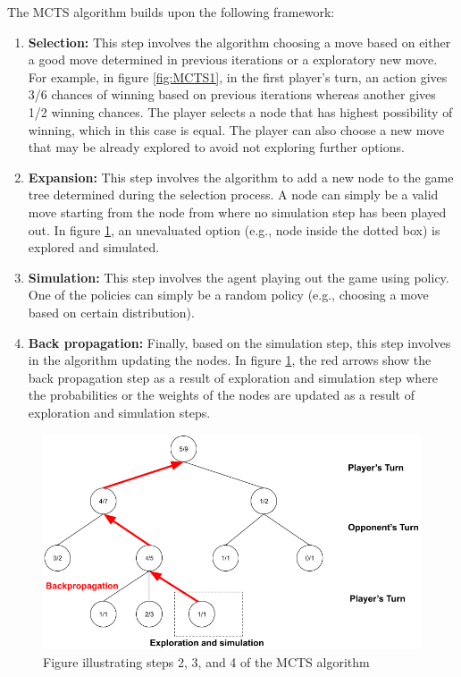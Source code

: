The \gls{MCTS} algorithm builds upon the following framework:
\begin{enumerate}
    \item \textbf{Selection:} This step involves the algorithm choosing a move based on either a good move determined in previous iterations or a exploratory new move. For example, in figure \ref{fig:MCTS1}, in the first player's turn, an action gives 3/6 chances of winning based on previous iterations whereas another gives 1/2 winning chances. The player selects a node that has highest possibility of winning, which in this case is equal. The player can also choose a new move that may be already explored to avoid not exploring further options.
    \item \textbf{Expansion:} This step involves the algorithm to add a new node to the game tree determined during the selection process. A node can simply be a valid move starting from the node from where no simulation step has been played out. In figure \ref{fig:MCTS2}, an unevaluated option (e.g., node inside the dotted box) is explored and simulated.
    \item \textbf{Simulation:} This step involves the agent playing out the game using policy. One of the policies can simply be a random policy (e.g., choosing a move based on certain distribution).
    \item \textbf{Back propagation:} Finally, based on the simulation step, this step involves in the algorithm updating the nodes. In figure \ref{fig:MCTS2}, the red arrows show the back propagation step as a result of exploration and simulation step where the probabilities or the weights of the nodes are updated as a result of exploration and simulation steps.
\end{enumerate}

\begin{figure}[!ht]
    \centering
    \includegraphics[width=\linewidth]{../img/MCTS2.png}
    \caption{Figure illustrating steps 2, 3, and 4 of the MCTS algorithm}
    \label{fig:MCTS2}
\end{figure}

